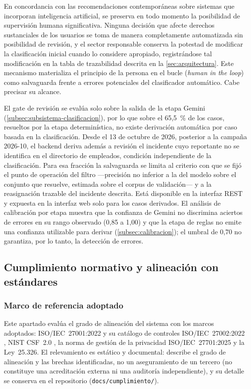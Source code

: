 En concordancia con las recomendaciones contemporáneas sobre sistemas que incorporan inteligencia artificial, se preserva en todo momento la posibilidad de supervisión humana significativa. Ninguna decisión que afecte derechos sustanciales de los usuarios se toma de manera completamente automatizada sin posibilidad de revisión, y el sector responsable conserva la potestad de modificar la clasificación inicial cuando lo considere apropiado, registrándose tal modificación en la tabla de trazabilidad descrita en la \autoref{sec:arquitectura}. Este mecanismo materializa el principio de la persona en el bucle (\emph{human in the loop}) como salvaguarda frente a errores potenciales del clasificador automático. Cabe precisar su alcance.

El gate de revisión se evalúa solo sobre la salida de la etapa Gemini (\autoref{subsec:subsistema-clasificacion}), por lo que sobre el 65,5~\% de los casos, resueltos por la etapa determinística, no existe derivación automática por caso basada en la clasificación. Desde el 13 de octubre de 2026, posterior a la campaña 2026-10, el backend deriva además a revisión el incidente cuyo reportante no se identifica en el directorio de empleados, condición independiente de la clasificación. Para esa fracción la salvaguarda se limita al criterio con que se fijó el punto de operación del filtro ---precisión no inferior a la del modelo sobre el conjunto que resuelve, estimada sobre el corpus de validación--- y a la reasignación trazable del incidente descrita. Está disponible en la interfaz REST y expuesta en la interfaz web solo para los casos derivados. El análisis de calibración por etapa muestra que la confianza de Gemini no discrimina aciertos de errores en su rango observado (0,85 a 1,00) y que la etapa de reglas no emite una confianza utilizable para derivar (\autoref{subsec:calibracion}); el umbral de 0,70 no garantiza, por lo tanto, la detección de errores.

\subsection{Cumplimiento normativo y alineación con estándares}\label{subsec:cumplimiento}

\subsubsection{Marco de referencia adoptado}\label{subsec:cumplimiento-marco}

Este apartado evalúa el grado de alineación del sistema con los marcos adoptados: ISO/IEC~27001:2022 \parencite{ISO27001_2022} y su catálogo de controles ISO/IEC~27002:2022 \parencite{ISO27002_2022}, NIST CSF~2.0 \parencite{NIST2024_csf}, la norma de gestión de la privacidad ISO/IEC~27701:2025 \parencite{ISO27701_2025} y la Ley~25.326. El relevamiento es estático y documental: describe el grado de alineación y las brechas identificadas, no un aseguramiento de un tercero (no constituye una acreditación externa ni una auditoría independiente), y su detalle se conserva en el repositorio (\texttt{docs/cumplimiento/}).

